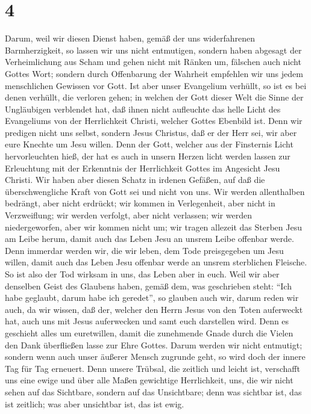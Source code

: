 \hypertarget{section-3}{%
\section{4}\label{section-3}}

 Darum, weil wir diesen Dienst haben, gemäß der uns
widerfahrenen Barmherzigkeit, so lassen wir uns nicht entmutigen,
 sondern haben abgesagt der Verheimlichung aus Scham und
gehen nicht mit Ränken um, fälschen auch nicht Gottes Wort; sondern
durch Offenbarung der Wahrheit empfehlen wir uns jedem menschlichen
Gewissen vor Gott.  Ist aber unser Evangelium verhüllt, so
ist es bei denen verhüllt, die verloren gehen;  in welchen
der Gott dieser Welt die Sinne der Ungläubigen verblendet hat, daß ihnen
nicht aufleuchte das helle Licht des Evangeliums von der Herrlichkeit
Christi, welcher Gottes Ebenbild ist.  Denn wir predigen
nicht uns selbst, sondern Jesus Christus, daß er der Herr sei, wir aber
eure Knechte um Jesu willen.  Denn der Gott, welcher aus
der Finsternis Licht hervorleuchten hieß, der hat es auch in unsern
Herzen licht werden lassen zur Erleuchtung mit der Erkenntnis der
Herrlichkeit Gottes im Angesicht Jesu Christi.  Wir haben
aber diesen Schatz in irdenen Gefäßen, auf daß die überschwengliche
Kraft von Gott sei und nicht von uns.  Wir werden
allenthalben bedrängt, aber nicht erdrückt; wir kommen in Verlegenheit,
aber nicht in Verzweiflung;  wir werden verfolgt, aber
nicht verlassen; wir werden niedergeworfen, aber wir kommen nicht um;
 wir tragen allezeit das Sterben Jesu am Leibe herum,
damit auch das Leben Jesu an unsrem Leibe offenbar werde.
 Denn immerdar werden wir, die wir leben, dem Tode
preisgegeben um Jesu willen, damit auch das Leben Jesu offenbar werde an
unsrem sterblichen Fleische.  So ist also der Tod wirksam
in uns, das Leben aber in euch.  Weil wir aber denselben
Geist des Glaubens haben, gemäß dem, was geschrieben steht: ``Ich habe
geglaubt, darum habe ich geredet'', so glauben auch wir, darum reden wir
auch,  da wir wissen, daß der, welcher den Herrn Jesus
von den Toten auferweckt hat, auch uns mit Jesus auferwecken und samt
euch darstellen wird.  Denn es geschieht alles um
euretwillen, damit die zunehmende Gnade durch die Vielen den Dank
überfließen lasse zur Ehre Gottes.  Darum werden wir
nicht entmutigt; sondern wenn auch unser äußerer Mensch zugrunde geht,
so wird doch der innere Tag für Tag erneuert.  Denn
unsere Trübsal, die zeitlich und leicht ist, verschafft uns eine ewige
und über alle Maßen gewichtige Herrlichkeit,  uns, die
wir nicht sehen auf das Sichtbare, sondern auf das Unsichtbare; denn was
sichtbar ist, das ist zeitlich; was aber unsichtbar ist, das ist ewig.

